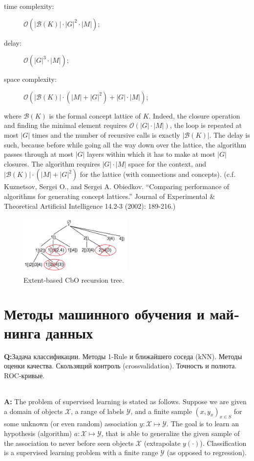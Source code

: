 \documentclass[a4paper]{article}
\newcommand{\Xcal}{\mathcal{X}}
\newcommand{\Ycal}{\mathcal{Y}}
\newcommand{\rus}[1]{\foreignlanguage{russian}{#1}}
\begin{document}
\begin{description}
    \item[time complexity:] $\mathcal{O}(|\mathcal{B}(K)|\cdot |G|^2 \cdot |M|)$;
    \item[delay:] $\mathcal{O}(|G|^3 \cdot |M|)$;
    \item[space complexity:] $\mathcal{O}(|\mathcal{B}(K)|\cdot(|M| + |G|^2)
                                          + |G| \cdot |M|)$;
\end{description}
where $\mathcal{B}(K)$ is the formal concept lattice of $K$. Indeed, the closure
operation and finding the minimal element requires $\mathcal{O}(|G| \cdot |M|)$,
the loop is repeated at most $|G|$ times and the number of recursive calls is exactly
$|\mathcal{B}(K)|$. The delay is such, because before while going all the way down
over the lattice, the algorithm passes through at most $|G|$ layers within which
it has to make at most $|G|$ closures. The algorithm requires $|G| \cdot |M|$ space
for the context, and $|\mathcal{B}(K)|\cdot(|M| + |G|^2)$ for the lattice (with
connections and concepts).
(c.f. Kuznetsov, Sergei O., and Sergei A. Obiedkov. ``Comparing performance of algorithms
for generating concept lattices.'' Journal of Experimental \& Theoretical Artificial
Intelligence 14.2-3 (2002): 189-216.)
\begin{figure}
    \centering
    \includegraphics[width=0.5\textwidth]{cbo_tree.png}
    \caption{Extent-based CbO recursion tree.}
    \label{fig:cbo_tree}
\end{figure}


\section{\rus{Методы машинного обучения и майнинга данных}} %
\label{sec:mldm}

\noindent\textbf{Q:}\rus{Задача классификации.  Методы 1-Rule и ближайшего соседа
(kNN). Методы оценки качества. Скользящий контроль (crossvalidation). Точность и
полнота. ROC-кривые.}

\hfill\\\textbf{A:}
The problem of supervised learning is stated as follows. Suppose we are given a
domain of objects $\Xcal$, a range of labels $\Ycal$, and a finite sample $(x, y_x)_{x\in S}$
for some unknown (or even random) association $y:\Xcal\mapsto\Ycal$. The goal is
to learn an hypothesis (algorithm) $a:\Xcal\mapsto\Ycal$, that is able to generalize
the given sample of the association to never before seen objects $\Xcal$ (extrapolate
$y(\cdot)$). Classification is a supervised learning problem with a finite range
$\Ycal$ (as opposed to regression).
\end{document}
